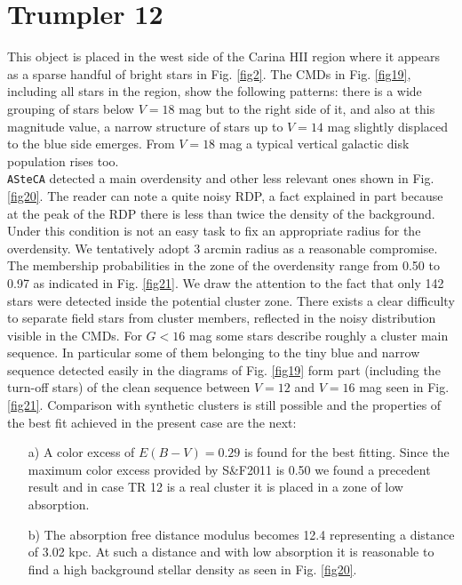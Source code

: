 \documentclass[draft]{aa}
\begin{document}
\section{Trumpler 12}

This object is placed in the west side of the Carina HII region where it appears
as a sparse handful of bright stars in Fig. \ref{fig2}. The CMDs in Fig.
\ref{fig19}, including all stars in the region, show the following patterns:
there is a wide grouping of stars below $V = 18$ mag but to the right side of
it, and also at this magnitude value, a narrow structure of stars up to $V= 14$
mag slightly displaced to the blue side emerges. From $V = 18$ mag a typical
vertical galactic disk population rises too.\\

\texttt{ASteCA} detected a main overdensity and other less relevant ones shown
in Fig. \ref{fig20}. The reader can note a quite noisy RDP, a fact explained in
part because at the peak of the RDP there is less than twice the density of the
background. Under this condition is not an easy task to fix an appropriate
radius for the overdensity. We tentatively adopt 3 arcmin radius as a reasonable
compromise. The membership probabilities in the zone of the overdensity range
from 0.50 to 0.97 as indicated in Fig. \ref{fig21}. We draw the attention to
the fact that only 142 stars were detected inside the potential cluster zone.
%
There exists a clear difficulty to separate field stars from cluster
members, reflected in the noisy distribution visible in the CMDs. For $G<16$
mag some stars describe roughly a cluster main sequence.
In particular some of them belonging to the tiny blue and narrow
sequence detected easily in the diagrams of Fig. \ref{fig19} form part
(including the turn-off stars) of the clean sequence between $V = 12$ and $V =
16$ mag seen in Fig. \ref{fig21}. Comparison with synthetic clusters is still
possible and the properties of the best fit achieved in the present case are the
next:

\begin{itemize}
\item [a)] A color excess of $E(B-V) = 0.29$ is found for the best fitting.
    Since the maximum color excess provided by S\&F2011 is 0.50 we found a
    precedent result and in case TR 12 is a real cluster it is placed in a
    zone of low absorption.
\item [b)] The absorption free distance modulus becomes 12.4 representing a
    distance of 3.02 kpc. At such a distance and with low absorption it is
    reasonable to find a high background stellar density as seen in Fig. 
    \ref{fig20}.
\end{itemize}
\end{document}
